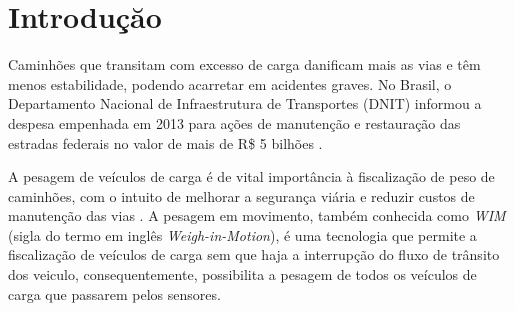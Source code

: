 \documentclass{ufscThesis}
\begin{document}
\capa  

%

\paginaresumo
\paginaabstract
\setcounter{page}{1}
\sumario

\setcounter{page}{1}
\chapter{Introduçăo}\label{introducao}
Caminhões que transitam com excesso de carga danificam mais as vias e têm menos estabilidade, podendo acarretar em acidentes graves. No Brasil, o Departamento Nacional de Infraestrutura de Transportes (DNIT) informou a despesa empenhada em 2013 para ações de manutenção e restauração das estradas federais no valor de mais de R\$ 5 bilhões \cite{tech:relatorio-de-gestao-do-exercicio-de-2013}.

A pesagem de veículos de carga é de vital importância à fiscalização de peso de caminhões, com o intuito de melhorar a segurança viária e reduzir custos de manutenção das vias \cite{techreport:jacob2002wave}. A pesagem em movimento, também conhecida como \textit{WIM} (sigla do termo em inglês \textit{Weigh-in-Motion}), é uma tecnologia que permite a fiscalização de veículos de carga sem que haja a interrupção do fluxo de trânsito dos veiculo, consequentemente, possibilita a pesagem de todos os veículos de carga que passarem pelos sensores.
\end{document}
